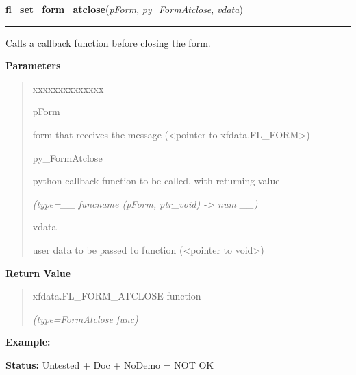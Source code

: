 \hspace{.8\funcindent}\begin{boxedminipage}{\funcwidth}

    \raggedright \textbf{fl\_set\_form\_atclose}(\textit{pForm}, \textit{py\_FormAtclose}, \textit{vdata})

    \vspace{-1.5ex}

    \rule{\textwidth}{0.5\fboxrule}
\setlength{\parskip}{2ex}
    Calls a callback function before closing the form.

\setlength{\parskip}{1ex}
      \textbf{Parameters}
      \vspace{-1ex}

      \begin{quote}
        \begin{Ventry}{xxxxxxxxxxxxxx}

          \item[pForm]

          form that receives the message ({\textless}pointer to 
          xfdata.FL\_FORM{\textgreater})

          \item[py\_FormAtclose]

          python callback function to be called, with returning value

            {\it (type=\_\_ funcname (pForm, ptr\_void) -{\textgreater} num \_\_)}

          \item[vdata]

          user data to be passed to function ({\textless}pointer to 
          void{\textgreater})

        \end{Ventry}

      \end{quote}

      \textbf{Return Value}
    \vspace{-1ex}

      \begin{quote}
      xfdata.FL\_FORM\_ATCLOSE function

      {\it (type=FormAtclose func)}

      \end{quote}

\textbf{Example:} 

\textbf{Status:} Untested + Doc + NoDemo = NOT OK



    \end{boxedminipage}

